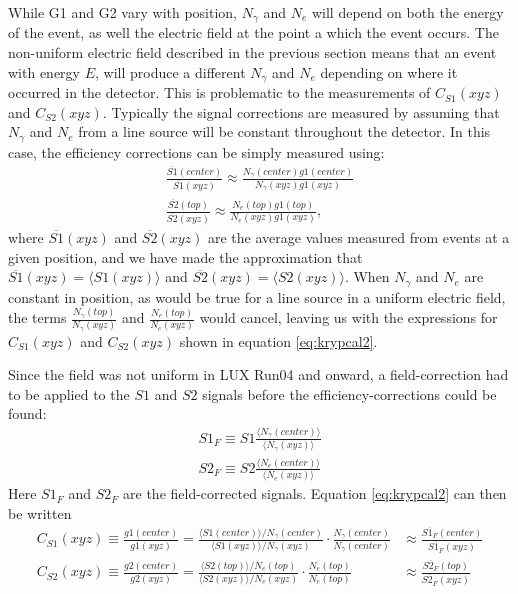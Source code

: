While G1 and G2 vary with position, $N_{\gamma}$ and $N_e$ will depend on both the energy of the event, as well the electric field at the point a which the event occurs. The non-uniform electric field described in the previous section means that an event with energy $E$, will produce a different $N_{\gamma}$ and $N_{e}$ depending on where it occurred in the detector. This is problematic to the measurements of $C_{S1}(xyz)$ and $C_{S2}(xyz)$. Typically the signal corrections are measured by assuming that $N_{\gamma}$ and $N_{e}$ from a line source will be constant throughout the detector. In this case, the efficiency corrections can be simply measured using:
\begin{equation}\label{eq:krypcal3}
\begin{split}
\frac{\overline{S1}(center)}{\overline{S1}(xyz)}\approx \frac{N_{\gamma}(center)g1(center)}{N_{\gamma}(xyz)g1(xyz)}\\[1em]
\frac{\overline{S2}(top)}{\overline{S2}(xyz)}\approx \frac{N_{e}(top)g1(top)}{N_{e}(xyz)g1(xyz)},
\end{split}
\end{equation}
where $\overline{S1}(xyz)$ and $\overline{S2}(xyz)$ are the average values measured from events at a given position, and we have made the approximation that $\overline{S1}(xyz)=\langle S1(xyz) \rangle$ and $\overline{S2}(xyz)=\langle S2(xyz) \rangle$. When $N_{\gamma}$ and $N_e$ are constant in position, as would be true for a line source in a uniform electric field, the terms $\frac{N_{\gamma}(top)}{N_{\gamma}(xyz)}$ and $\frac{N_{e}(top)}{N_{e}(xyz)}$ would cancel, leaving us with the expressions for $C_{S1}(xyz)$ and $C_{S2}(xyz)$ shown in equation \ref{eq:krypcal2}. 

Since the field was not uniform in LUX Run04 and onward, a field-correction had to be applied to the $S1$ and $S2$ signals before the efficiency-corrections could be found:
\begin{equation}\label{eq:krypcal4}
\begin{split}
S1_F\equiv S1 \frac{\langle N_{\gamma}(center) \rangle}{\langle N_{\gamma}(xyz)\rangle}\\[1em]
S2_F\equiv S2 \frac{\langle N_{e}(center)\rangle}{\langle N_{e}(xyz)\rangle}
\end{split}
\end{equation}
Here $S1_F$ and $S2_F$ are the field-corrected signals. Equation \ref{eq:krypcal2} can then be written
\begin{equation}\label{eq:krypcal5}
\begin{split}
C_{S1}(xyz) \equiv \frac{g1(center)}{g1(xyz)}=\frac{\langle S1(center) \rangle / N_{\gamma}(center)}{\langle S1(xyz) \rangle / N_{\gamma}(xyz)}\cdot \frac{N_{\gamma}(center)}{N_{\gamma}(center)} &\approx \frac{\overline{S1_F}(center)}{\overline{S1_F}(xyz)}\\[1em]
C_{S2}(xyz) \equiv \frac{g2(center)}{g2(xyz)}=\frac{\langle S2(top) \rangle / N_{e}(top)}{\langle S2(xyz) \rangle / N_{e}(xyz)} \cdot \frac{N_{e}(top)}{N_{e}(top)} &\approx \frac{\overline{S2_F}(top)}{\overline{S2_F}(xyz)}
\end{split}
\end{equation}

